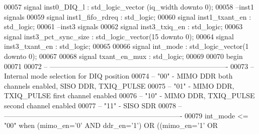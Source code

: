 \begin{DoxyCode}
00057 \textcolor{keywordflow}{signal} \textcolor{vhdlchar}{inst0_DIQ_l}         \textcolor{vhdlchar}{:} \textcolor{comment}{std\_logic\_vector} \textcolor{vhdlchar}{(}\textcolor{vhdlchar}{iq_width} \textcolor{keywordflow}{downto} \textcolor{vhdllogic}{}\textcolor{vhdllogic}{0}\textcolor{vhdlchar}{)};
00058 \textcolor{keyword}{--inst1 signals}
00059 \textcolor{keywordflow}{signal} \textcolor{vhdlchar}{inst1_fifo_rdreq}    \textcolor{vhdlchar}{:} \textcolor{comment}{std\_logic};
00060 \textcolor{keywordflow}{signal} \textcolor{vhdlchar}{inst1_txant_en}      \textcolor{vhdlchar}{:} \textcolor{comment}{std\_logic};
00061 \textcolor{keyword}{--inst3 signals}
00062 \textcolor{keywordflow}{signal} \textcolor{vhdlchar}{inst3_txiq_en}       \textcolor{vhdlchar}{:} \textcolor{comment}{std\_logic};
00063 \textcolor{keywordflow}{signal} \textcolor{vhdlchar}{inst3_pct_sync_size} \textcolor{vhdlchar}{:} \textcolor{comment}{std\_logic\_vector}\textcolor{vhdlchar}{(}\textcolor{vhdllogic}{}\textcolor{vhdllogic}{15} \textcolor{keywordflow}{downto} \textcolor{vhdllogic}{}\textcolor{vhdllogic}{0}\textcolor{vhdlchar}{)};
00064 \textcolor{keywordflow}{signal} \textcolor{vhdlchar}{inst3_txant_en}      \textcolor{vhdlchar}{:} \textcolor{comment}{std\_logic};
00065 
00066 \textcolor{keywordflow}{signal} \textcolor{vhdlchar}{int_mode}            \textcolor{vhdlchar}{:} \textcolor{comment}{std\_logic\_vector}\textcolor{vhdlchar}{(}\textcolor{vhdllogic}{}\textcolor{vhdllogic}{1} \textcolor{keywordflow}{downto} \textcolor{vhdllogic}{}\textcolor{vhdllogic}{0}\textcolor{vhdlchar}{)};
00067 
00068 \textcolor{keywordflow}{signal} \textcolor{vhdlchar}{txant_en_mux}        \textcolor{vhdlchar}{:} \textcolor{comment}{std\_logic};
00069   
00070 \textcolor{vhdlkeyword}{begin}
00071    
00072 \textcolor{keyword}{   -- ----------------------------------------------------------------------------}
00073 \textcolor{keyword}{--Internal mode selection for DIQ position}
00074 \textcolor{keyword}{-- "00" - MIMO DDR both channels enabled, SISO DDR, TXIQ\_PULSE}
00075 \textcolor{keyword}{-- "01" - MIMO DDR, TXIQ\_PULSE first channel enabled}
00076 \textcolor{keyword}{-- "10" - MIMO DDR, TXIQ\_PULSE second channel enabled}
00077 \textcolor{keyword}{-- "11" - SISO SDR }
00078 \textcolor{keyword}{-- ----------------------------------------------------------------------------}
00079  \textcolor{vhdlchar}{int_mode} \textcolor{vhdlchar}{<=} \textcolor{vhdllogic}{"00"} \textcolor{keywordflow}{when} \textcolor{vhdlchar}{(}\textcolor{vhdlchar}{mimo_en}\textcolor{vhdlchar}{=}\textcolor{vhdlchar}{'}\textcolor{vhdllogic}{}\textcolor{vhdllogic}{0}\textcolor{vhdlchar}{'} \textcolor{keywordflow}{AND} \textcolor{vhdlchar}{ddr_en}\textcolor{vhdlchar}{=}\textcolor{vhdlchar}{'}\textcolor{vhdllogic}{}\textcolor{vhdllogic}{1}\textcolor{vhdlchar}{'}\textcolor{vhdlchar}{)} \textcolor{keywordflow}{OR} \textcolor{vhdlchar}{(}\textcolor{vhdlchar}{(}\textcolor{vhdlchar}{mimo_en}\textcolor{vhdlchar}{=}\textcolor{vhdlchar}{'}\textcolor{vhdllogic}{}\textcolor{vhdllogic}{1}\textcolor{vhdlchar}{'} \textcolor{keywordflow}{OR} \textcolor{vhdlchar}{
}
\end{DoxyCode}
